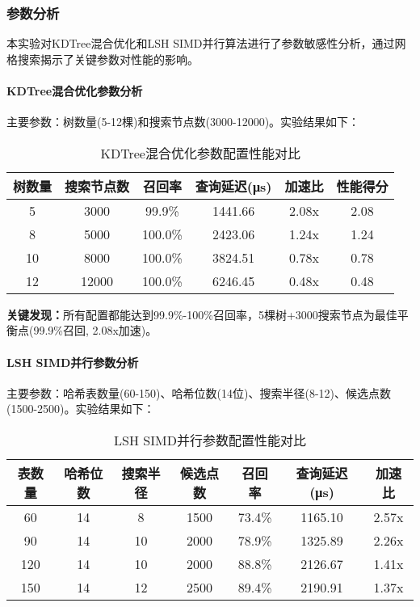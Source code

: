 \subsubsection{参数分析}

本实验对KDTree混合优化和LSH SIMD并行算法进行了参数敏感性分析，通过网格搜索揭示了关键参数对性能的影响。

\paragraph{KDTree混合优化参数分析}

主要参数：树数量(5-12棵)和搜索节点数(3000-12000)。实验结果如下：

\begin{table}[h]
\centering
\caption{KDTree混合优化参数配置性能对比}
\begin{tabular}{|c|c|c|c|c|c|}
\hline
\textbf{树数量} & \textbf{搜索节点数} & \textbf{召回率} & \textbf{查询延迟(μs)} & \textbf{加速比} & \textbf{性能得分} \\
\hline
5 & 3000 & 99.9\% & 1441.66 & 2.08x & 2.08 \\
8 & 5000 & 100.0\% & 2423.06 & 1.24x & 1.24 \\
10 & 8000 & 100.0\% & 3824.51 & 0.78x & 0.78 \\
12 & 12000 & 100.0\% & 6246.45 & 0.48x & 0.48 \\
\hline
\end{tabular}
\end{table}

\textbf{关键发现：}所有配置都能达到99.9\%-100\%召回率，5棵树+3000搜索节点为最佳平衡点(99.9\%召回, 2.08x加速)。

\paragraph{LSH SIMD并行参数分析}

主要参数：哈希表数量(60-150)、哈希位数(14位)、搜索半径(8-12)、候选点数(1500-2500)。实验结果如下：

\begin{table}[h]
\centering
\caption{LSH SIMD并行参数配置性能对比}
\begin{tabular}{|c|c|c|c|c|c|c|}
\hline
\textbf{表数量} & \textbf{哈希位数} & \textbf{搜索半径} & \textbf{候选点数} & \textbf{召回率} & \textbf{查询延迟(μs)} & \textbf{加速比} \\
\hline
60 & 14 & 8 & 1500 & 73.4\% & 1165.10 & 2.57x \\
90 & 14 & 10 & 2000 & 78.9\% & 1325.89 & 2.26x \\
120 & 14 & 10 & 2000 & 88.8\% & 2126.67 & 1.41x \\
150 & 14 & 12 & 2500 & 89.4\% & 2190.91 & 1.37x \\
\hline
\end{tabular}
\end{table}

